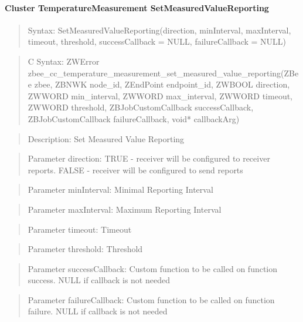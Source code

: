 \paragraph{Cluster TemperatureMeasurement SetMeasuredValueReporting}
\begin{quote}Syntax: SetMeasuredValueReporting(direction, minInterval, maxInterval, timeout, threshold, successCallback = NULL, failureCallback = NULL)\end{quote}
\begin{quote}C Syntax: ZWError zbee\_cc\_temperature\_measurement\_set\_measured\_value\_reporting(ZBee zbee, ZBNWK node\_id, ZEndPoint endpoint\_id, ZWBOOL direction, ZWWORD min\_interval, ZWWORD max\_interval, ZWWORD timeout, ZWWORD threshold, ZBJobCustomCallback successCallback, ZBJobCustomCallback failureCallback, void* callbackArg)\end{quote}
\begin{quote}Description: Set Measured Value Reporting\end{quote}
\begin{quote}Parameter direction: TRUE  - receiver will be configured to receiver reports. FALSE - receiver will be configured to send reports\end{quote}
\begin{quote}Parameter minInterval: Minimal Reporting Interval\end{quote}
\begin{quote}Parameter maxInterval: Maximum Reporting Interval\end{quote}
\begin{quote}Parameter timeout: Timeout\end{quote}
\begin{quote}Parameter threshold: Threshold\end{quote}
\begin{quote}Parameter successCallback: Custom function to be called on function success. NULL if callback is not needed\end{quote}
\begin{quote}Parameter failureCallback: Custom function to be called on function failure. NULL if callback is not needed\end{quote}


